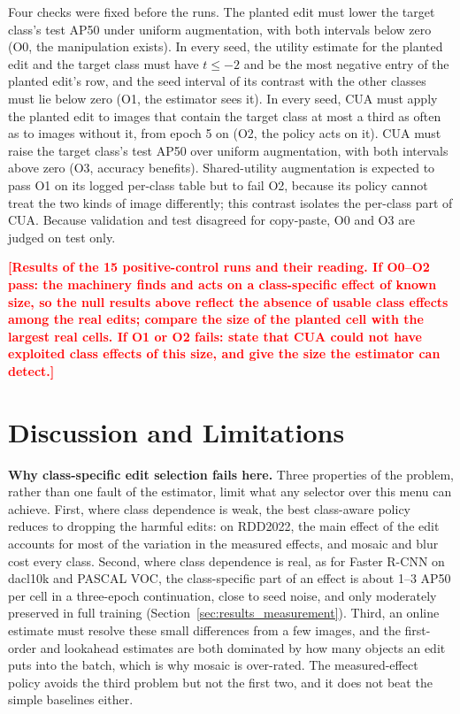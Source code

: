 \documentclass[conference]{IEEEtran}
\newcommand{\todo}[1]{\textcolor{red}{\textbf{[#1]}}}
\begin{document}
Four checks were fixed before the runs. The planted edit must lower the target class's test AP50 under uniform augmentation, with both intervals below zero (O0, the manipulation exists). In every seed, the utility estimate for the planted edit and the target class must have $t\leq-2$ and be the most negative entry of the planted edit's row, and the seed interval of its contrast with the other classes must lie below zero (O1, the estimator sees it). In every seed, CUA must apply the planted edit to images that contain the target class at most a third as often as to images without it, from epoch 5 on (O2, the policy acts on it). CUA must raise the target class's test AP50 over uniform augmentation, with both intervals above zero (O3, accuracy benefits). Shared-utility augmentation is expected to pass O1 on its logged per-class table but to fail O2, because its policy cannot treat the two kinds of image differently; this contrast isolates the per-class part of CUA. Because validation and test disagreed for copy-paste, O0 and O3 are judged on test only.

\todo{Results of the 15 positive-control runs and their reading. If O0--O2 pass: the machinery finds and acts on a class-specific effect of known size, so the null results above reflect the absence of usable class effects among the real edits; compare the size of the planted cell with the largest real cells. If O1 or O2 fails: state that CUA could not have exploited class effects of this size, and give the size the estimator can detect.}

\section{Discussion and Limitations}
\label{sec:discussion}

\noindent\textbf{Why class-specific edit selection fails here.} Three properties of the problem, rather than one fault of the estimator, limit what any selector over this menu can achieve. First, where class dependence is weak, the best class-aware policy reduces to dropping the harmful edits: on RDD2022, the main effect of the edit accounts for most of the variation in the measured effects, and mosaic and blur cost every class. Second, where class dependence is real, as for Faster R-CNN on dacl10k and PASCAL VOC, the class-specific part of an effect is about 1--3 AP50 per cell in a three-epoch continuation, close to seed noise, and only moderately preserved in full training (Section~\ref{sec:results_measurement}). Third, an online estimate must resolve these small differences from a few images, and the first-order and lookahead estimates are both dominated by how many objects an edit puts into the batch, which is why mosaic is over-rated. The measured-effect policy avoids the third problem but not the first two, and it does not beat the simple baselines either.
\end{document}
